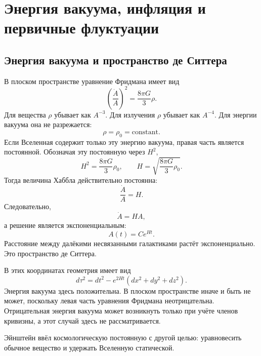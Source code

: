 \chapter{Энергия вакуума, инфляция и первичные флуктуации}

\section{Энергия вакуума и пространство де Ситтера}

В плоском пространстве уравнение Фридмана имеет вид
\begin{equation}
\left(\frac{\dot A}{A}\right)^2=\frac{8\pi G}{3}\rho.
\end{equation}
Для вещества \(\rho\) убывает как \(A^{-3}\). Для излучения \(\rho\) убывает как \(A^{-4}\). Для энергии вакуума она не разрежается:
\begin{equation}
\rho=\rho_0=\text{constant}.
\end{equation}
Если Вселенная содержит только эту энергию вакуума, правая часть является постоянной. Обозначая эту постоянную через \(H^2\),
\begin{equation}
H^2=\frac{8\pi G}{3}\rho_0,
\qquad
H=\sqrt{\frac{8\pi G}{3}\rho_0}.
\end{equation}
Тогда величина Хаббла действительно постоянна:
\begin{equation}
\frac{\dot A}{A}=H.
\end{equation}
Следовательно,
\begin{equation}
\dot A=HA,
\end{equation}
а решение является экспоненциальным:
\begin{equation}
A(t)=C e^{Ht}.
\end{equation}
Расстояние между далёкими несвязанными галактиками растёт экспоненциально. Это пространство де Ситтера.

В этих координатах геометрия имеет вид
\begin{equation}
d\tau^2=dt^2-e^{2Ht}\left(dx^2+dy^2+dz^2\right).
\end{equation}
Энергия вакуума здесь положительна. В плоском пространстве иначе и быть не может, поскольку левая часть уравнения Фридмана неотрицательна. Отрицательная энергия вакуума может возникнуть только при учёте членов кривизны, а этот случай здесь не рассматривается.

Эйнштейн ввёл космологическую постоянную с другой целью: уравновесить обычное вещество и удержать Вселенную статической.

